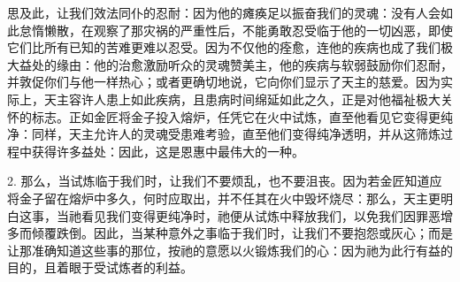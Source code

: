 思及此，让我们效法同仆的忍耐：因为他的瘫痪足以振奋我们的灵魂：没有人会如此怠惰懒散，在观察了那灾祸的严重性后，不能勇敢忍受临于他的一切凶恶，即使它们比所有已知的苦难更难以忍受。因为不仅他的痊愈，连他的疾病也成了我们极大益处的缘由：他的治愈激励听众的灵魂赞美主，他的疾病与软弱鼓励你们忍耐，并敦促你们与他一样热心；或者更确切地说，它向你们显示了天主的慈爱。因为实际上，天主容许人患上如此疾病，且患病时间绵延如此之久，正是对他福祉极大关怀的标志。正如金匠将金子投入熔炉，任凭它在火中试炼，直至他看见它变得更纯净：同样，天主允许人的灵魂受患难考验，直至他们变得纯净透明，并从这筛炼过程中获得许多益处：因此，这是恩惠中最伟大的一种。\par

2. 那么，当试炼临于我们时，让我们不要烦乱，也不要沮丧。因为若金匠知道应将金子留在熔炉中多久，何时应取出，并不任其在火中毁坏烧尽：那么，天主更明白这事，当祂看见我们变得更纯净时，祂便从试炼中释放我们，以免我们因罪恶增多而倾覆跌倒。因此，当某种意外之事临于我们时，让我们不要抱怨或灰心；而是让那准确知道这些事的那位，按祂的意愿以火锻炼我们的心：因为祂为此行有益的目的，且着眼于受试炼者的利益。\par

